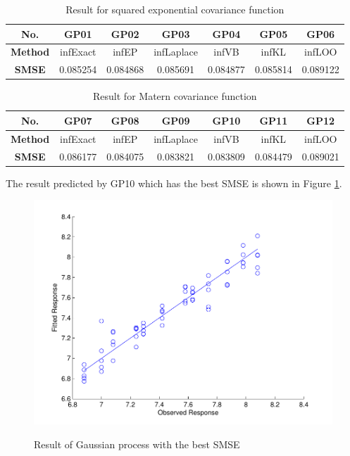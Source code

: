 \documentclass[a4paper]{article}
\begin{document}
\begin{table}[h]
\centering
\begin{tabular}{|c|c|c|c|c|c|c|}
\hline
\textbf{No.} & GP01 & GP02 & GP03 & GP04 & GP05 & GP06 \\
\hline
\textbf{Method} & infExact & infEP & infLaplace & infVB & infKL & infLOO \\
\hline
\textbf{SMSE} & 0.085254 & 0.084868 & 0.085691 & 0.084877 & 0.085814 & 0.089122 \\
\hline
\end{tabular}
\caption{Result for squared exponential covariance function}\label{table1}
\end{table}
\begin{table}[h]
\centering
\begin{tabular}{|c|c|c|c|c|c|c|}
\hline
\textbf{No.} & GP07 & GP08 & GP09 & GP10 & GP11 & GP12 \\
\hline
\textbf{Method} & infExact & infEP & infLaplace & infVB & infKL & infLOO \\
\hline
\textbf{SMSE} & 0.086177 & 0.084075 & 0.083821 & 0.083809 & 0.084479 & 0.089021 \\
\hline
\end{tabular}
\caption{Result for Matern covariance function}\label{table2}
\end{table}

The result predicted by GP10 which has the best SMSE is shown in Figure \ref{pic9}.
\begin{figure}
  \centering
  \includegraphics[width=.6\textwidth]{images/predict_GP09.pdf}\\
  \caption{Result of Gaussian process with the best SMSE}\label{pic9}
\end{figure}


\end{document}
